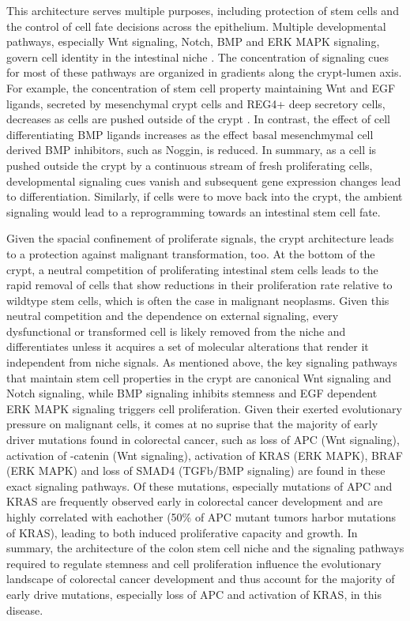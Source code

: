 \begin{flushleft}
This architecture serves multiple purposes, including protection of stem cells and the control of cell fate decisions across the epithelium. Multiple developmental pathways, especially Wnt signaling, Notch, BMP and ERK MAPK signaling, govern cell identity in the intestinal niche \cite{Gehart2019}. The concentration of signaling cues for most of these pathways are organized in gradients along the crypt-lumen axis. For example, the concentration of stem cell property maintaining Wnt and EGF ligands, secreted by mesenchymal crypt cells and REG4+ deep secretory cells, decreases as cells are pushed outside of the crypt  \cite{Sasaki2016}. In contrast, the effect of cell differentiating BMP ligands increases as the effect basal mesenchmymal cell derived BMP inhibitors, such as Noggin, is reduced. In summary, as a cell is pushed outside the crypt by a continuous stream of fresh proliferating cells, developmental signaling cues vanish and subsequent gene expression changes lead to differentiation. Similarly, if cells were to move back into the crypt, the ambient signaling would lead to a reprogramming towards an intestinal stem cell fate. 

Given the spacial confinement of proliferate signals, the crypt architecture leads to a protection against malignant transformation, too. At the bottom of the crypt, a neutral competition of proliferating intestinal stem cells leads to the rapid removal of cells that show reductions in their proliferation rate relative to wildtype stem cells, which is often the case in malignant neoplasms. Given this neutral competition and the dependence on external signaling, every dysfunctional or transformed cell is likely removed from the niche and differentiates unless it acquires a set of molecular alterations that render it independent from niche signals. As mentioned above, the key signaling pathways that maintain stem cell properties in the crypt are canonical Wnt signaling and Notch signaling, while BMP signaling inhibits stemness and EGF dependent ERK MAPK signaling triggers cell proliferation. Given their exerted evolutionary pressure on malignant cells, it comes at no suprise that the majority of early driver mutations found in colorectal cancer, such as loss of APC (Wnt signaling), activation of \textbeta-catenin (Wnt signaling), activation of KRAS (ERK MAPK), BRAF (ERK MAPK) and loss of SMAD4 (TGFb/BMP signaling) are found in these exact signaling pathways. Of these mutations, especially mutations of APC and KRAS are frequently observed early in colorectal cancer development and are highly correlated with eachother (50\% of APC mutant tumors harbor mutations of KRAS), leading to both induced proliferative capacity and growth. In summary, the architecture of the colon stem cell niche and the signaling pathways required to regulate stemness and cell proliferation influence the evolutionary landscape of colorectal cancer development and thus account for the majority of early drive mutations, especially loss of APC and activation of KRAS, in this disease.



\end{flushleft}
